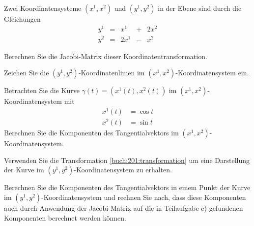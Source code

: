 Zwei Koordinatensysteme $(x^1,x^2)$ und $(y^1,y^2)$ in der Ebene sind
durch die Gleichungen
\begin{equation}
\renewcommand\arraycolsep{2pt}
\begin{array}{rcrcr}
y^1 &=&  x^1 &+& 2x^2 \\
y^2 &=& 2x^1 &-&  x^2
\end{array}
\label{buch:201:transformation}
\end{equation}
\begin{teilaufgaben}
\item
Berechnen Sie die Jacobi-Matrix dieser Koordinatentransformation.
\item
Zeichen Sie die $(y^1,y^2)$-Koordinatenlinien im
$(x^1,x^2)$-Koordinatensystem ein.
\item
Betrachten Sie die Kurve $\gamma(t) = (x^1(t),x^2(t))$ im
$(x^1,x^2)$-Koordinatensystem mit
\begin{align*}
x^1(t) &= \cos t \\
x^2(t) &= \sin t
\end{align*}
Berechnen Sie die Komponenten des Tangentialvektors im
$(x^1,x^2)$-Koordinaten\-sys\-tem.
\item
Verwenden Sie die Transformation \eqref{buch:201:transformation}
um eine Darstellung der Kurve im $(y^1,y^2)$-Koordinaten\-system
zu erhalten.
\item
Berechnen Sie die Komponenten des Tangentialvektors in einem
Punkt der Kurve im $(y^1,y^2)$-Koordinatensystem und rechnen Sie
nach, dass diese Komponenten auch durch Anwendung der Jacobi-Matrix
auf die in Teilaufgabe c) gefundenen Komponenten berechnet werden
können.
\end{teilaufgaben}

